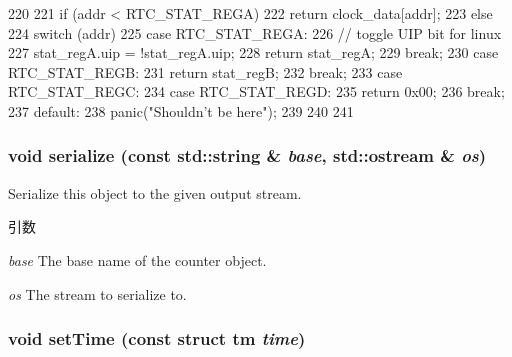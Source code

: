 \begin{DoxyCode}
220 {
221     if (addr < RTC_STAT_REGA)
222         return clock_data[addr];
223     else {
224         switch (addr) {
225           case RTC_STAT_REGA:
226             // toggle UIP bit for linux
227             stat_regA.uip = !stat_regA.uip;
228             return stat_regA;
229             break;
230           case RTC_STAT_REGB:
231             return stat_regB;
232             break;
233           case RTC_STAT_REGC:
234           case RTC_STAT_REGD:
235             return 0x00;
236             break;
237           default:
238             panic("Shouldn't be here");
239         }
240     }
241 }
\end{DoxyCode}
\hypertarget{classMC146818_ab4138b21b48e3371a8e20df72b675a88}{
\subsubsection[{serialize}]{\setlength{\rightskip}{0pt plus 5cm}void serialize (const std::string \& {\em base}, \/  std::ostream \& {\em os})}}
\label{classMC146818_ab4138b21b48e3371a8e20df72b675a88}
Serialize this object to the given output stream. 
\begin{DoxyParams}{引数}
\item[{\em base}]The base name of the counter object. \item[{\em os}]The stream to serialize to. \end{DoxyParams}
\hypertarget{classMC146818_a2d06df539c4db142b96a5848870ebd28}{
\subsubsection[{setTime}]{\setlength{\rightskip}{0pt plus 5cm}void setTime (const struct tm {\em time})}}
\label{classMC146818_a2d06df539c4db142b96a5848870ebd28}



